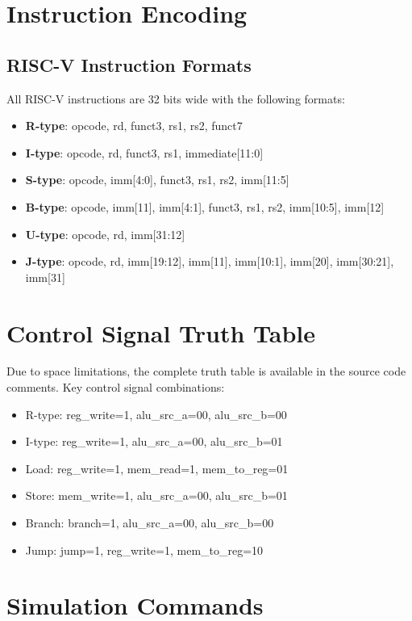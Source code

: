 \section{Instruction Encoding}

\subsection{RISC-V Instruction Formats}

All RISC-V instructions are 32 bits wide with the following formats:

\begin{itemize}
    \item \textbf{R-type}: opcode, rd, funct3, rs1, rs2, funct7
    \item \textbf{I-type}: opcode, rd, funct3, rs1, immediate[11:0]
    \item \textbf{S-type}: opcode, imm[4:0], funct3, rs1, rs2, imm[11:5]
    \item \textbf{B-type}: opcode, imm[11], imm[4:1], funct3, rs1, rs2, imm[10:5], imm[12]
    \item \textbf{U-type}: opcode, rd, imm[31:12]
    \item \textbf{J-type}: opcode, rd, imm[19:12], imm[11], imm[10:1], imm[20], imm[30:21], imm[31]
\end{itemize}

\section{Control Signal Truth Table}

Due to space limitations, the complete truth table is available in the source code comments. Key control signal combinations:

\begin{itemize}
    \item R-type: reg\_write=1, alu\_src\_a=00, alu\_src\_b=00
    \item I-type: reg\_write=1, alu\_src\_a=00, alu\_src\_b=01
    \item Load: reg\_write=1, mem\_read=1, mem\_to\_reg=01
    \item Store: mem\_write=1, alu\_src\_a=00, alu\_src\_b=01
    \item Branch: branch=1, alu\_src\_a=00, alu\_src\_b=00
    \item Jump: jump=1, reg\_write=1, mem\_to\_reg=10
\end{itemize}

\section{Simulation Commands}

